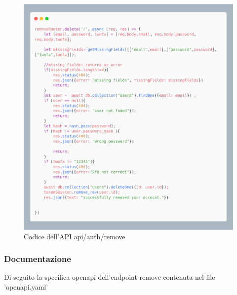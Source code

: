 \documentclass{report}
\begin{document}
\begin{figure}[H]
	\centering\includegraphics[width=1\textwidth]{images/microservizio-autenticazione/remove-carbon.png}
	Codice dell'API api/auth/remove
\end{figure}
\subsubsection*{Documentazione}
Di seguito la specifica openapi dell'endpoint remove contenuta nel file 'openapi.yaml'
\end{document}
